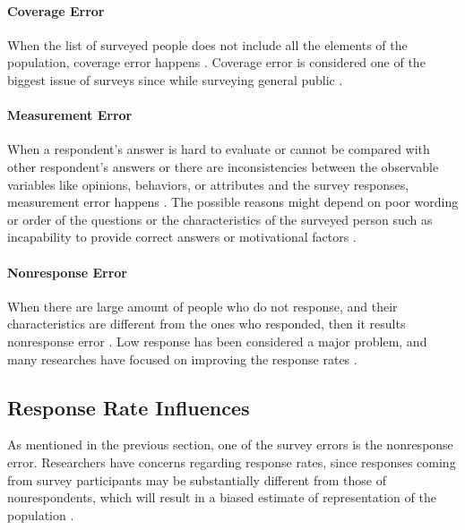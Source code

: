 \paragraph{Coverage Error}
When the list of surveyed people does not include all the elements of the population, coverage error happens \cite[page 9]{Dillman2006}. Coverage error is considered one of the biggest issue of surveys since while surveying general public \cite{Dillman1991}.

\paragraph{Measurement Error}
When a respondent's answer is hard to evaluate or cannot be compared with other respondent's answers or there are inconsistencies between the observable variables like opinions, behaviors, or attributes and the survey responses, measurement error happens \cite[page 9]{Dillman2006} \cite{Dillman1991}. The possible reasons might depend on poor wording or order of the questions or the characteristics of the surveyed person such as incapability to provide correct answers or motivational factors \cite{Dillman1991}.

\paragraph{Nonresponse Error}
When there are large amount of people who do not response, and their characteristics are different from the ones who responded, then it results nonresponse error \cite[page 9]{Dillman2006}. Low response has been considered a major problem, and many researches have focused on improving the response rates \cite{Dillman1991}.

\subsection{Response Rate Influences}
\label{sec:2.1.3:ResRatInf}

As mentioned in the previous section, one of the survey errors is the nonresponse error. Researchers have concerns regarding response rates, since responses coming from survey participants may be substantially different from those of nonrespondents, which will result in a biased estimate of representation of the population \cite{Bogen1996}.
\vspace{1cm}

